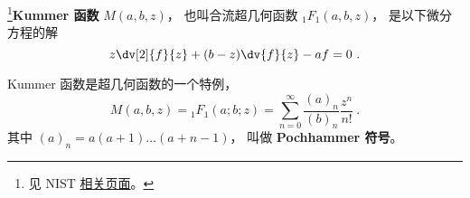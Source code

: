 
\begin{issues}
\issueDraft
\end{issues}

\footnote{见 NIST \href{https://dlmf.nist.gov/13.2}{相关页面}。}\textbf{Kummer 函数} $M(a, b, z)$， 也叫合流超几何函数 $_1F_1(a, b, z)$， 是以下微分方程的解
\begin{equation}
z\dv[2]{f}{z} + (b-z)\dv{f}{z} - a f = 0~.
\end{equation}

Kummer 函数是超几何函数的一个特例， 
\begin{equation}
M(a, b, z) = {_1F_1}(a; b; z) = \sum_{n=0}^\infty \frac{(a)_n}{(b)_n} \frac{z^n}{n!}~.
\end{equation}
其中 $(a)_n = a(a+1)\dots(a+n-1)$， 叫做 \textbf{Pochhammer 符号}。


